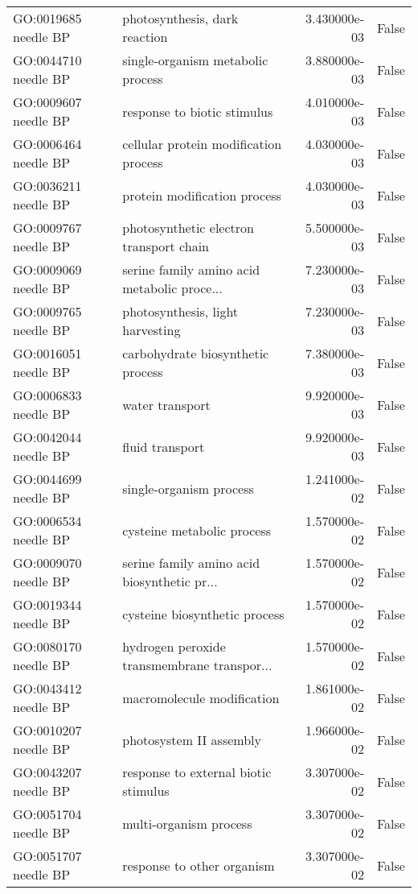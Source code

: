 \begin{tabular}{llrl}
GO:0019685 needle BP       &  photosynthesis, dark reaction &  3.430000e-03 &  False \\
GO:0044710 needle BP       &  single-organism metabolic process &  3.880000e-03 &  False \\
GO:0009607 needle BP       &  response to biotic stimulus &  4.010000e-03 &  False \\
GO:0006464 needle BP       &  cellular protein modification process &  4.030000e-03 &  False \\
GO:0036211 needle BP       &  protein modification process &  4.030000e-03 &  False \\
GO:0009767 needle BP       &  photosynthetic electron transport chain &  5.500000e-03 &  False \\
GO:0009069 needle BP       &  serine family amino acid metabolic proce... &  7.230000e-03 &  False \\
GO:0009765 needle BP       &  photosynthesis, light harvesting &  7.230000e-03 &  False \\
GO:0016051 needle BP       &  carbohydrate biosynthetic process &  7.380000e-03 &  False \\
GO:0006833 needle BP       &  water transport &  9.920000e-03 &  False \\
GO:0042044 needle BP       &  fluid transport &  9.920000e-03 &  False \\
GO:0044699 needle BP       &  single-organism process &  1.241000e-02 &  False \\
GO:0006534 needle BP       &  cysteine metabolic process &  1.570000e-02 &  False \\
GO:0009070 needle BP       &  serine family amino acid biosynthetic pr... &  1.570000e-02 &  False \\
GO:0019344 needle BP       &  cysteine biosynthetic process &  1.570000e-02 &  False \\
GO:0080170 needle BP       &  hydrogen peroxide transmembrane transpor... &  1.570000e-02 &  False \\
GO:0043412 needle BP       &  macromolecule modification &  1.861000e-02 &  False \\
GO:0010207 needle BP       &  photosystem II assembly &  1.966000e-02 &  False \\
GO:0043207 needle BP       &  response to external biotic stimulus &  3.307000e-02 &  False \\
GO:0051704 needle BP       &  multi-organism process &  3.307000e-02 &  False \\
GO:0051707 needle BP       &  response to other organism &  3.307000e-02 &  False \\

\end{tabular}
